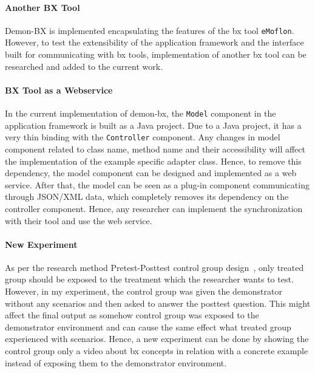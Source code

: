\paragraph{Another BX Tool}
Demon-BX is implemented encapsulating the features of the bx tool \texttt{eMoflon}. However, to test the extensibility of the application framework and the interface built for communicating with bx tools, implementation of another bx tool can be researched and added to the current work.

\paragraph{BX Tool as a Webservice}
In the current implementation of demon-bx, the \texttt{Model} component in the application framework is built as a Java project. Due to a Java project, it has a very thin binding with the \texttt{Controller} component. Any changes in model component related to class name, method name and their accessibility will affect the implementation of the example specific adapter class. Hence, to remove this dependency, the model component can be designed and implemented as a web service. After that, the model can be seen as a plug-in component communicating through JSON/XML data, which completely removes its dependency on the controller component. Hence, any researcher can implement the synchronization with their tool and use the web service.

\paragraph{New Experiment}
As per the research method Pretest-Posttest control group design~\cite{expandquasiexpdesign}, only treated group should be exposed to the treatment which the researcher wants to test. However, in my experiment, the control group was given the demonstrator without any scenarios and then asked to answer the posttest question. This might affect the final output as somehow control group was exposed to the demonstrator environment and can cause the same effect what treated group experienced with scenarios. Hence, a new experiment can be done by showing the control group only a video about bx concepts in relation with a concrete example instead of exposing them to the demonstrator environment.




